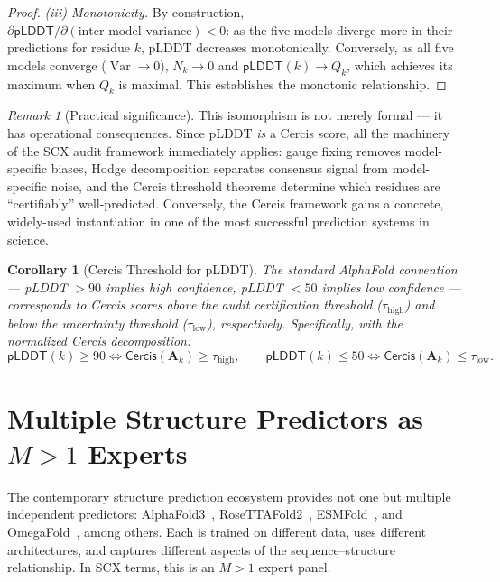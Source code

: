 \documentclass[12pt,a4paper]{article}
\newtheorem{corollary}[theorem]{Corollary}
\theoremstyle{remark}
\newtheorem{remark}[theorem]{Remark}
\newcommand{\Cercis}{\textsf{Cercis}}
\newcommand{\pLDDT}{\textsf{pLDDT}}
\DeclareMathOperator{\Var}{Var}
\begin{document}
\begin{proof}
\medskip\noindent\textit{(iii) Monotonicity.}
By construction, $\partial \pLDDT / \partial (\text{inter-model variance}) < 0$: as the five models diverge more in their predictions for residue $k$, pLDDT decreases monotonically.
Conversely, as all five models converge ($\Var \to 0$), $N_k \to 0$ and $\pLDDT(k) \to Q_k$, which achieves its maximum when $Q_k$ is maximal.
This establishes the monotonic relationship.
\end{proof}

\begin{remark}[Practical significance]
This isomorphism is not merely formal — it has operational consequences.
Since pLDDT \emph{is} a Cercis score, all the machinery of the SCX audit framework immediately applies: gauge fixing removes model-specific biases, Hodge decomposition separates consensus signal from model-specific noise, and the Cercis threshold theorems determine which residues are ``certifiably'' well-predicted.
Conversely, the Cercis framework gains a concrete, widely-used instantiation in one of the most successful prediction systems in science.
\end{remark}

\begin{corollary}[Cercis Threshold for pLDDT]
\label{cor:plddt-threshold}
The standard AlphaFold convention — pLDDT $> 90$ implies high confidence, pLDDT $< 50$ implies low confidence — corresponds to Cercis scores above the audit certification threshold ($\tau_{\text{high}}$) and below the uncertainty threshold ($\tau_{\text{low}}$), respectively.
Specifically, with the normalized Cercis decomposition:
\begin{equation}
    \pLDDT(k) \geq 90 \iff \Cercis(\mathbf{A}_k) \geq \tau_{\text{high}}, \qquad
    \pLDDT(k) \leq 50 \iff \Cercis(\mathbf{A}_k) \leq \tau_{\text{low}}.
\end{equation}
\end{corollary}

\section{Multiple Structure Predictors as $M > 1$ Experts}
\label{sec:multi-expert}

The contemporary structure prediction ecosystem provides not one but multiple independent predictors: AlphaFold3~\cite{abramson2024accurate}, RoseTTAFold2~\cite{baek2021accurate}, ESMFold~\cite{lin2023evolutionary}, and OmegaFold~\cite{wu2022high}, among others.
Each is trained on different data, uses different architectures, and captures different aspects of the sequence--structure relationship.
In SCX terms, this is an $M > 1$ expert panel.
\end{document}
